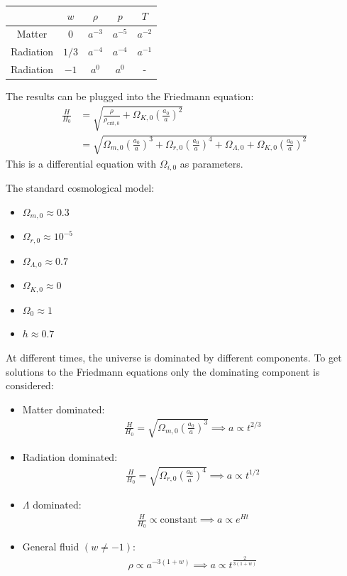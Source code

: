 \begin{table}[H]
\centering
\begin{tabular}{|c|c|c|c|c|}
\hline
 & $w$ & $\rho$ & $p$ & $T$\\
\hline
Matter & $0$ &  $a^{-3}$ & $a^{-5}$ & $a^{-2}$\\
\hline
Radiation & $1/3$ & $a^{-4}$ & $a^{-4}$ & $a^{-1}$\\
\hline
Radiation & $-1$ & $a^{0}$ & $a^{0}$ & -\\
\hline
\end{tabular}
\end{table}

The results can be plugged into the Friedmann equation:
\begin{align*}
	\frac{H}{H_0} 
	&= \sqrt{\frac{\rho}{\rho_{\text{crit}, 0}} + \Omega_{K,0} \left( \frac{a_0}{a} \right)^2 }\\
	&= \sqrt{
		\Omega_{m,0} \left( \frac{a_0}{a} \right)^3
		+ \Omega_{r,0} \left( \frac{a_0}{a} \right)^4
		+ \Omega_{\Lambda,0}
		+ \Omega_{K,0} \left( \frac{a_0}{a} \right)^2
	}
\end{align*}
This is a differential equation with $\Omega_{i,0}$ as parameters.

The standard cosmological model:
\begin{itemize}
	\item $\Omega_{m,0} \approx 0.3$
	\item $\Omega_{r,0} \approx 10^{-5}$
	\item $\Omega_{\Lambda,0} \approx 0.7$
	\item $\Omega_{K,0} \approx 0$
	\item $\Omega_0 \approx 1$
	\item $h \approx 0.7$
\end{itemize}

At different times, the universe is dominated by different components. To get solutions to the Friedmann equations only the dominating component is considered:
\begin{itemize}
	\item Matter dominated:
	\begin{align*}
		\frac{H}{H_0} = \sqrt{\Omega_{m,0} \left( \frac{a_0}{a}\right)^3}
		\implies a \propto t^{2/3}
	\end{align*}
	\item Radiation dominated:
	\begin{align*}
		\frac{H}{H_0} = \sqrt{\Omega_{r,0} \left( \frac{a_0}{a} \right)^4}
		\implies a \propto t^{1/2}
	\end{align*}
	\item $\Lambda$ dominated:
	\begin{align*}
		\frac{H}{H_0} \propto \text{constant}
		\implies a \propto e^{H t}
	\end{align*}
	\item General fluid $(w \neq -1)$:
	\begin{align*}
		\rho \propto a^{-3(1+w)} \implies a \propto t^{\frac{2}{3(1+w)}}
	\end{align*}
\end{itemize}

